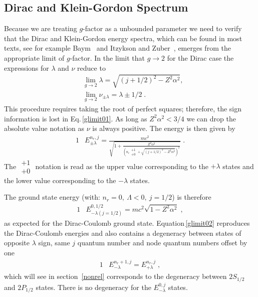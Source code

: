 \documentclass[epj]{svjour}
\begin{document}
\subsection{Dirac and Klein-Gordon Spectrum} \label{glimit}
Because we are treating $g$-factor as a unbounded parameter we need to verify that the Dirac and Klein-Gordon energy spectra, which can be found in most texts, see for example Baym~\cite{b69} and Itzykson and Zuber~\cite{iz80}, emerges from the appropriate limit of $g$-factor. In the limit that $g\rightarrow2$ for the Dirac case the expressions for $\lambda$ and $\nu$ reduce to
\begin{subequations}
\begin{alignat}{1}
\label{glimit01} &\lim_{g\rightarrow2}\lambda=\sqrt{\displaystyle(j+1/2)^{2}-Z^{2}\alpha^{2}},\\
&\lim_{g\rightarrow2}\nu_{\pm\lambda}=\lambda\pm1/2\;.
\end{alignat}
\end{subequations}
This procedure requires taking the root of perfect squares; therefore, the sign information is lost in Eq.\,\eqref{glimit01}. As long as $Z^{2}\alpha^{2}<3/4$ we can drop the absolute value notation as $\nu$ is always positive. The energy is then given by
\begin{alignat}{1}
\label{glimit02} &E_{\pm\lambda}^{n_{r},j}=\frac{mc^{2}}{\sqrt{1+\displaystyle\frac{Z^{2}\alpha^{2}}{\left(n_{r}\begin{smallmatrix} +1 \\ +0 \end{smallmatrix}+\sqrt{\displaystyle(j+1/2)^{2}-Z^{2}\alpha^{2}}\right)^{2}}}}\;.
\end{alignat}
The $\begin{smallmatrix} +1 \\ +0 \end{smallmatrix}$ notation is read as the upper value corresponding to the $+\lambda$ states and the lower value corresponding to the $-\lambda$ states. 

The ground state energy (with: $n_{r}=0,\ \Lambda<0,\ j=1/2$) is therefore
\begin{alignat}{1}
\label{glimit07} &E^{0,1/2}_{-\lambda(j=1/2)}=mc^{2}\sqrt{1-Z^{2}\alpha^{2}}\;,\end{alignat}
as expected for the Dirac-Coulomb ground state. Equation\,\eqref{glimit02} reproduces the Dirac-Coulomb energies and also contains a degeneracy between states of opposite $\lambda$ sign, same $j$ quantum number and node quantum numbers offset by one
\begin{alignat}{1}
\label{glimit03} &E^{n_{r}+1,j}_{-\lambda}=E^{n_{r},j}_{+\lambda}\;,\end{alignat}
which will see in section~\ref{nonrel} corresponds to the degeneracy between $2S_{1/2}$ and $2P_{1/2}$ states. There is no degeneracy for the $E^{0,j}_{-\lambda}$ states. 
\end{document}
